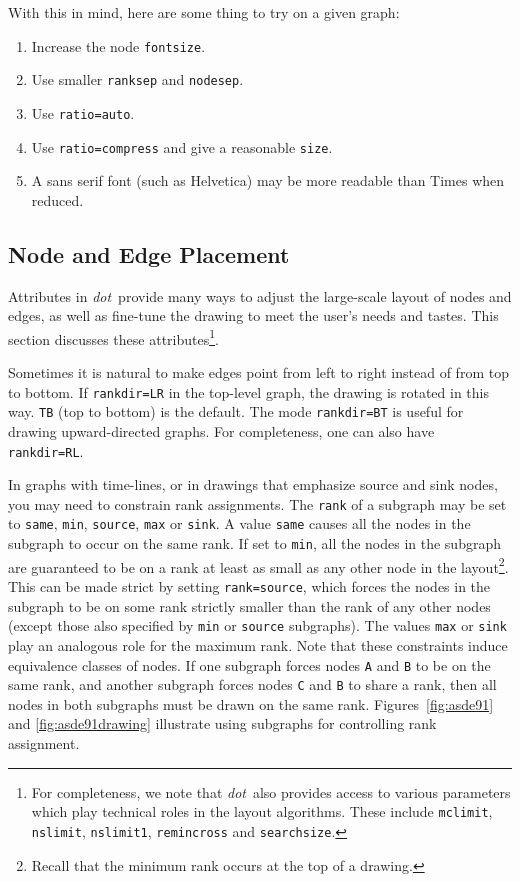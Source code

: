 \documentclass[11pt]{article}
\def\dot{{\it dot}}
\begin{document}
With this in mind, here are some thing to try on a given graph:
\begin{enumerate}
\item Increase the node \verb"fontsize".
\item Use smaller \verb"ranksep" and \verb"nodesep".
\item Use \verb"ratio=auto".
\item Use \verb"ratio=compress" and give a reasonable \verb"size".
\item A sans serif font (such as Helvetica) may be more readable than Times
when reduced.
\end{enumerate}

\subsection{Node and Edge Placement}

Attributes in \dot\ provide many ways to adjust the large-scale
layout of nodes and edges, as well as fine-tune the drawing to
meet the user's needs and tastes. This section discusses these
attributes\footnote{For completeness, we note that \dot\ also provides 
access to various parameters which play technical roles in the 
layout algorithms. These include {\tt mclimit}, 
{\tt nslimit}, {\tt nslimit1}, {\tt remincross} and {\tt searchsize}.}.

Sometimes it is natural to make edges point from left to right
instead of from top to bottom.
If \verb"rankdir=LR" in the top-level graph, the drawing is rotated
in this way.  \verb"TB" (top to bottom) is the default. The mode
\verb"rankdir=BT" is useful for drawing upward-directed graphs.
For completeness, one can also have \verb"rankdir=RL".

In graphs with time-lines, or in drawings that emphasize source and sink nodes,
you may need to constrain rank assignments.
The \verb"rank" of a subgraph may be set to {\tt same}, {\tt min}, 
{\tt source}, {\tt max} or {\tt sink}.
A value {\tt same} causes all the nodes in the subgraph to occur
on the same rank. If set to {\tt min}, all the nodes in the subgraph
are guaranteed to be on a rank at least as small as any other node in the
layout\footnote{Recall that the minimum rank occurs at the top of a drawing.}.
This can be made strict by setting {\tt rank=source}, which
forces the nodes in the subgraph to be on some rank strictly smaller
than the rank of any other nodes (except those also specified by 
{\tt min} or {\tt source} subgraphs).
The values {\tt max} or {\tt sink} play an analogous role for the
maximum rank.
Note that these constraints induce equivalence classes of nodes. If one
subgraph forces nodes {\tt A} and {\tt B} to be on the same rank, and
another subgraph forces nodes {\tt C} and {\tt B} to share a rank, then
all nodes in both subgraphs must be drawn on the same rank.
Figures~\ref{fig:asde91} and \ref{fig:asde91drawing}
illustrate using subgraphs for controlling rank assignment.
\end{document}
